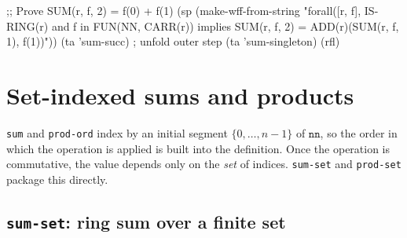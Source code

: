 \begin{VNBcode}
;; Prove SUM(r, f, 2) = f(0) + f(1)
(sp (make-wff-from-string
  "forall([r, f], IS-RING(r) and f in FUN(NN, CARR(r)) implies
     SUM(r, f, 2) = ADD(r)(SUM(r, f, 1), f(1))"))
(ta 'sum-succ)    ; unfold outer step
(ta 'sum-singleton)
(rfl)
\end{VNBcode}

\section{Set-indexed sums and products}
\label{sec:sum-set-prod-set}

\texttt{sum} and \texttt{prod-ord} index by an initial segment
$\{0, \ldots, n-1\}$ of $\mathtt{nn}$, so the order in which the
operation is applied is built into the definition.  Once the operation
is commutative, the value depends only on the \emph{set} of indices.
\texttt{sum-set} and \texttt{prod-set} package this directly.

\subsection{\texttt{sum-set}: ring sum over a finite set}
\label{sec:sum-set}

